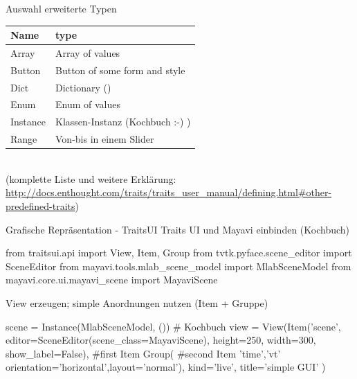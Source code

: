 \documentclass[hyperref={xetex}]{beamer}
\begin{document}
\begin{frame}[fragile]{Auswahl erweiterte Typen}
  \begin{tabular}[c]{ll}
    \textbf{Name} & \textbf{type} \\\hline
    Array &  Array of values\\
    Button & Button of some form and style \\
    Dict & Dictionary ()\\
    Enum & Enum of values\\
    Instance & Klassen-Instanz (Kochbuch :-) )\\
    Range & Von-bis in einem Slider
  \end{tabular}
\\\smallskip
  {\tiny (komplette Liste und weitere Erklärung:\\ 
  \url{http://docs.enthought.com/traits/traits_user_manual/defining.html#other-predefined-traits})}
\end{frame}

\begin{frame}[fragile]{Grafische Repräsentation - TraitsUI}
Traits UI und Mayavi einbinden (Kochbuch)
  \begin{pyin}
from traitsui.api import View, Item, Group
from tvtk.pyface.scene_editor import SceneEditor
from mayavi.tools.mlab_scene_model import MlabSceneModel
from mayavi.core.ui.mayavi_scene import MayaviScene
\end{pyin}
\alert{View} erzeugen; simple Anordnungen nutzen (Item + Gruppe)
\begin{pyin}
scene = Instance(MlabSceneModel, ()) # Kochbuch
view = View(Item('scene', editor=SceneEditor(scene_class=MayaviScene), height=250, width=300, show_label=False), #first Item
            Group( #second Item
                  'time','vt'
                  orientation='horizontal',layout='normal'),
            kind='live', title='simple GUI'
            )    
  \end{pyin}
\end{frame}
\end{document}
